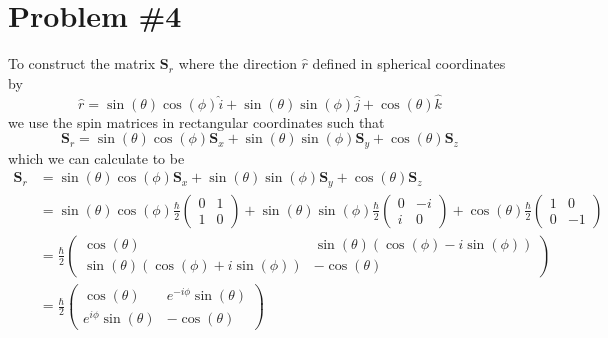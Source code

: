 \documentclass[11pt]{article}
\numberwithin{equation}{section}
\begin{document}
\section{Problem \#4}
To construct the matrix $\mathbf{S}_r$ where the direction $\hat{r}$ defined in spherical coordinates by
$$\hat{r} = \sin(\theta)\cos(\phi)\hat{i} + \sin(\theta)\sin(\phi)\hat{j}+\cos(\theta)\hat{k}$$
we use the spin matrices in rectangular coordinates such that
$$\mathbf{S}_r = \sin(\theta)\cos(\phi)\mathbf{S}_x + \sin(\theta)\sin(\phi)\mathbf{S}_y+\cos(\theta)\mathbf{S}_z$$
which we can calculate to be
\begin{align*}
\mathbf{S}_r &= \sin(\theta)\cos(\phi)\mathbf{S}_x + \sin(\theta)\sin(\phi)\mathbf{S}_y+\cos(\theta)\mathbf{S}_z\\
&=\sin(\theta)\cos(\phi)\frac{\hbar}{2}\left(\begin{array}{cc}
                                              0    &1\\  
                                              1    &0
                                             \end{array}\right) 
+ \sin(\theta)\sin(\phi)\frac{\hbar}{2}\left(\begin{array}{cc} 
                                              0    &-i\\  
                                              i    &0
                                             \end{array}\right)
+           \cos(\theta)\frac{\hbar}{2}\left(\begin{array}{cc} 
                                              1    &0\\  
                                              0    &-1
                                             \end{array}\right)\\
&= \frac{\hbar}{2}\left(\begin{array}{cc}
                         \cos(\theta)    &\sin(\theta)(\cos(\phi)-i\sin(\phi))\\
                         \sin(\theta)(\cos(\phi)+i\sin(\phi)) &-\cos(\theta)
                        \end{array}\right)\\
&= \frac{\hbar}{2}\left(\begin{array}{cc}
                         \cos(\theta)    &e^{-i\phi}\sin(\theta)\\
                         e^{i\phi}\sin(\theta) &-\cos(\theta)
                        \end{array}\right)
\end{align*}
\end{document}
